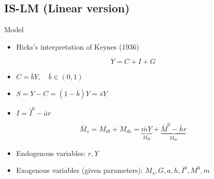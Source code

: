 \documentclass[final]{beamer}
\begin{document}
\subsection{IS-LM (Linear version)} %
\label{sub:is_lm_linear_version}
\begin{frame}[t]{Model}
	\begin{itemize}
		\item Hicks's interpretation of Keynes (1936)
	\end{itemize}
	\[
		Y=C+I+G \tag{IS Schedule: Real side}
	\]
	\begin{itemize}
		\item $C=\bar b Y, \quad \bar b \in (0,1)$
		\item $S=Y-C=(1-\bar b ) Y=\bar s Y$
		\item $I=\bar I^0-\bar a r$
	\end{itemize}
	\[
		\bar M_s = M_{dt}+M_{ds} = \underbrace{\bar m Y}_{M_{dt}} + \underbrace{\bar M^0 - \bar h r}_{M_{ds}} \tag{LM Schedule: Monetary side}
	\]
	\begin{itemize}
		\item Endogenous variables: $r,Y$
		\item Exogenous variables (given parameters): $M_s, G, a, h, I^0, M^0, m$
	\end{itemize}
\end{frame}
	
\end{document}

